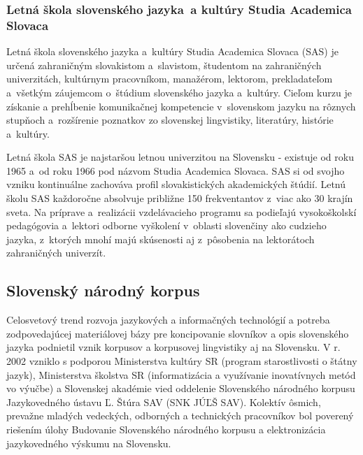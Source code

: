 \begin{multicols}{2}
\subsubsection{Letná škola slovenského jazyka~a kultúry Studia Academica Slovaca}
Letná škola slovenského jazyka a~kultúry Studia Academica Slovaca (SAS) je určená zahraničným slovakistom a~slavistom, študentom na zahraničných univerzitách, kultúrnym pracovníkom, manažérom, lektorom, prekladateľom a~všetkým záujemcom o~štúdium slovenského jazyka a~kultúry. Cieľom kurzu je získanie a prehĺbenie komunikačnej kompetencie v~slovenskom jazyku na rôznych stupňoch a~rozšírenie poznatkov zo slovenskej lingvistiky, literatúry, histórie a~kultúry.

Letná škola SAS je najstaršou letnou univerzitou na Slovensku - existuje od roku 1965 a~od roku 1966 pod názvom Studia Academica Slovaca. SAS si od svojho vzniku kontinuálne zachováva profil slovakistických akademických štúdií. Letnú školu SAS každoročne absolvuje približne 150 frekventantov z~viac ako 30 krajín sveta. Na príprave a~realizácii vzdelávacieho programu sa podieľajú vysokoškolskí pedagógovia a~lektori odborne vyškolení v~oblasti slovenčiny ako cudzieho jazyka, z~ktorých mnohí majú skúsenosti aj z~pôsobenia na lektorátoch zahraničných univerzít.


\subsection{Slovenský národný korpus}
Celosvetový trend rozvoja jazykových a informačných
technológií a potreba zodpovedajúcej materiálovej bázy pre
koncipovanie slovníkov a opis slovenského jazyka podnietil vznik
korpusov a korpusovej lingvistiky aj na Slovensku. V r. 2002 vzniklo s
podporou Ministerstva kultúry SR (program starostlivosti o štátny
jazyk), Ministerstva školstva SR (informatizácia a využívanie
inovatívnych metód vo výučbe) a Slovenskej akadémie vied oddelenie
Slovenského národného korpusu Jazykovedného ústavu Ľ. Štúra SAV
(SNK JÚĽŠ SAV). Kolektív ôsmich, prevažne mladých vedeckých,
odborných a technických pracovníkov bol poverený riešením úlohy
Budovanie Slovenského národného korpusu a elektronizácia
jazykovedného výskumu na Slovensku\cite{simkova2006b}.


\end{multicols}
